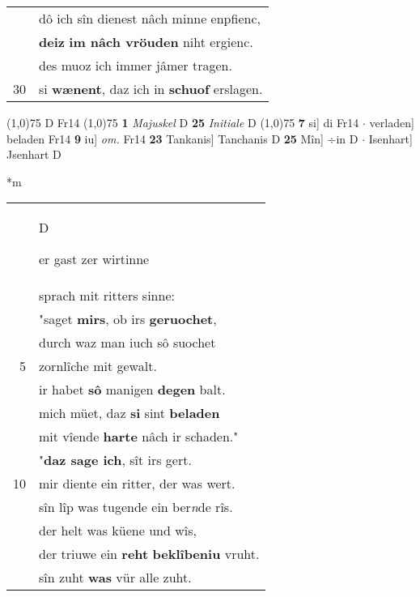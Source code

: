 \documentclass[8pt,a4paper,notitlepage]{article}
\begin{document}
\begin{table}[ht]
\begin{minipage}[t]{0.5\linewidth}
\begin{tabular}{rl}
 & dô ich sîn dienest nâch minne enpfienc,\\ 
 & \textbf{deiz} \textbf{im nâch vröuden} niht ergienc.\\ 
 & des muoz ich immer jâmer tragen.\\ 
30 & si \textbf{wænent}, daz ich in \textbf{schuof} erslagen.\\ 
\end{tabular}
\scriptsize
\line(1,0){75} \newline
D Fr14 \newline
\line(1,0){75} \newline
\textbf{1} \textit{Majuskel} D  \textbf{25} \textit{Initiale} D  \newline
\line(1,0){75} \newline
\textbf{7} si] di Fr14  $\cdot$ verladen] beladen Fr14 \textbf{9} iu] \textit{om.} Fr14 \textbf{23} Tankanis] Tanchanis D \textbf{25} Mîn] ÷in D  $\cdot$ Isenhart] Jsenhart D \newline
\end{minipage}
\hspace{0.5cm}
\begin{minipage}[t]{0.5\linewidth}
\small
\begin{center}*m
\end{center}
\begin{tabular}{rl}
 & \begin{large}D\end{large}er gast zer wirtinne\\ 
 & sprach mit ritters sinne:\\ 
 & "saget \textbf{mir}\textbf{s}, ob irs \textbf{geruochet},\\ 
 & durch waz man iuch sô suochet\\ 
5 & zornlîche mit gewalt.\\ 
 & ir habet \textbf{sô} manigen \textbf{degen} balt.\\ 
 & mich müet, daz \textbf{si} sint \textbf{beladen}\\ 
 & mit vîende \textbf{harte} nâch ir schaden."\\ 
 & "\textbf{daz sage ich}, sît irs gert.\\ 
10 & mir diente ein ritter, der was wert.\\ 
 & sîn lîp was tugende ein ber\textit{n}de rîs.\\ 
 & der helt was küene und wîs,\\ 
 & der triuwe ein \textbf{reht} \textbf{beklîbeniu} vruht.\\ 
 & sîn zuht \textbf{was} vür alle zuht.\\ 

\end{tabular}
\end{minipage}
\end{table}
\end{document}

